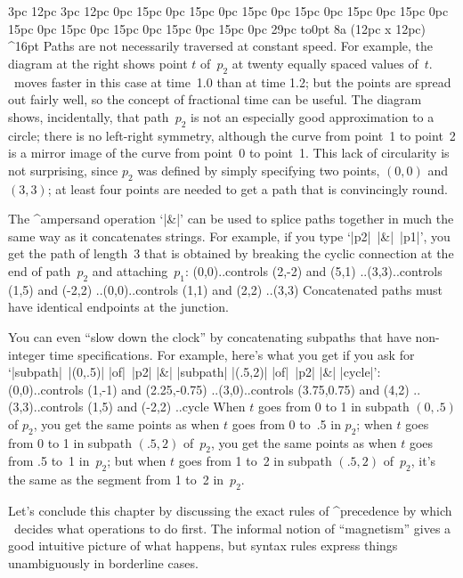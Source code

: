 {{{{{\ninepoint
\medbreak
{} 3pc 12pc 3pc 12pc
0pc 15pc 0pc 15pc 0pc 15pc 0pc 15pc 0pc 15pc 0pc 15pc
0pc 15pc 0pc 15pc 0pc 15pc 0pc 15pc 0pc 15pc 0pc 29pc
\noindent
\hbox to0pt{\hskip-3pc\dbend\hfill}%
\rightfig 8a (12pc x 12pc) ^16pt
Paths are not necessarily traversed at constant speed. For example,
the diagram at the right shows point $t$ of~$p_2$ at twenty equally
spaced values of~$t$.
\MF\ moves faster in this case at time~1.0 than at time 1.2; but the
points are spread out fairly well, so the concept of fractional
time can be useful. The diagram shows, incidentally, that
path~$p_2$ is not an especially good approximation to
a circle; there is no left-right symmetry, although the curve from point~1
to point~2 is a mirror image of the curve from point~0 to point~1.
This lack of circularity is not surprising, since
$p_2$ was defined by simply specifying two points, $(0,0)$ and~$(3,3)$;
at least four points are needed to get a path that is convincingly round.
\parfillskip=0pt\par}

\ddanger The ^{ampersand} operation `|&|' can be used to splice paths
together in much the same way as it concatenates strings. For example, if
you type `|p2|~|&|~|p1|', you get the path of length~3 that is obtained by
breaking the cyclic connection at the end of path~$p_2$ and attaching~$p_1$:
\begintt
(0,0)..controls (2,-2) and (5,1)
 ..(3,3)..controls (1,5) and (-2,2)
 ..(0,0)..controls (1,1) and (2,2)
 ..(3,3)
\endtt
Concatenated paths must have identical endpoints at the junction.

\ddanger You can even ``slow down the clock'' by concatenating subpaths
that have non-integer time specifications. For example, here's what you
get if you ask for `|subpath|~|(0,.5)| |of|~|p2| |&| |subpath| |(.5,2)|
|of|~|p2| |&| |cycle|':
\begintt
(0,0)..controls (1,-1) and (2.25,-0.75)
 ..(3,0)..controls (3.75,0.75) and (4,2)
 ..(3,3)..controls (1,5) and (-2,2)
 ..cycle
\endtt
When $t$ goes from 0 to 1 in subpath $(0,.5)$ of $p_2$, you get the same
points as when $t$ goes from 0 to~.5 in $p_2$; when $t$ goes from 0 to 1
in subpath $(.5,2)$ of~$p_2$, you get the same points as when $t$ goes
from .5 to~1 in~$p_2$; but when $t$ goes from 1 to~2 in subpath
$(.5,2)$ of~$p_2$, it's the same as the segment from 1 to~2 in~$p_2$.

\danger Let's conclude this chapter by discussing the exact rules of
^{precedence} by which \MF\ decides what operations to do first. The
informal notion of ``magnetism'' gives a good intuitive picture of what
happens, but syntax rules express things unambiguously in borderline cases.

}}}}
